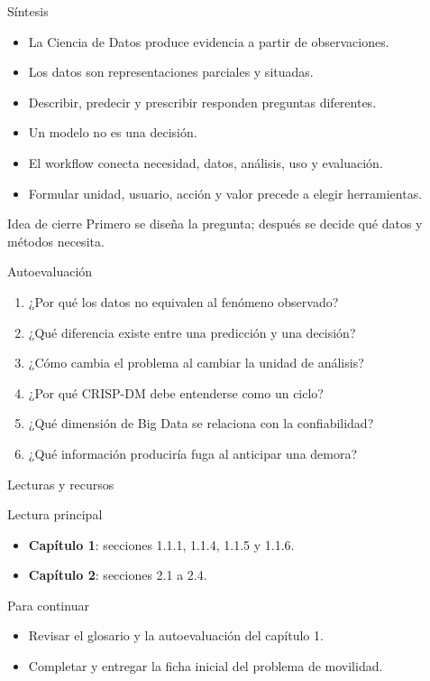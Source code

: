 \documentclass[aspectratio=169,11pt]{beamer}
\begin{document}
\begin{frame}{Síntesis}
  \begin{itemize}
    \item La Ciencia de Datos produce evidencia a partir de observaciones.
    \item Los datos son representaciones parciales y situadas.
    \item Describir, predecir y prescribir responden preguntas diferentes.
    \item Un modelo no es una decisión.
    \item El workflow conecta necesidad, datos, análisis, uso y evaluación.
    \item Formular unidad, usuario, acción y valor precede a elegir herramientas.
  \end{itemize}
  \vfill
  \begin{block}{Idea de cierre}
    Primero se diseña la pregunta; después se decide qué datos y métodos necesita.
  \end{block}
\end{frame}

\begin{frame}{Autoevaluación}
  \small
  \begin{enumerate}
    \item ¿Por qué los datos no equivalen al fenómeno observado?
    \item ¿Qué diferencia existe entre una predicción y una decisión?
    \item ¿Cómo cambia el problema al cambiar la unidad de análisis?
    \item ¿Por qué CRISP-DM debe entenderse como un ciclo?
    \item ¿Qué dimensión de Big Data se relaciona con la confiabilidad?
    \item ¿Qué información produciría fuga al anticipar una demora?
  \end{enumerate}
\end{frame}

\begin{frame}{Lecturas y recursos}
  \begin{block}{Lectura principal}
    \begin{itemize}
      \item \textbf{Capítulo 1}: secciones 1.1.1, 1.1.4, 1.1.5 y 1.1.6.
      \item \textbf{Capítulo 2}: secciones 2.1 a 2.4.
    \end{itemize}
  \end{block}
  \begin{block}{Para continuar}
    \begin{itemize}
      \item Revisar el glosario y la autoevaluación del capítulo 1.
      \item Completar y entregar la ficha inicial del problema de movilidad.
    \end{itemize}
  \end{block}
\end{frame}
\end{document}
